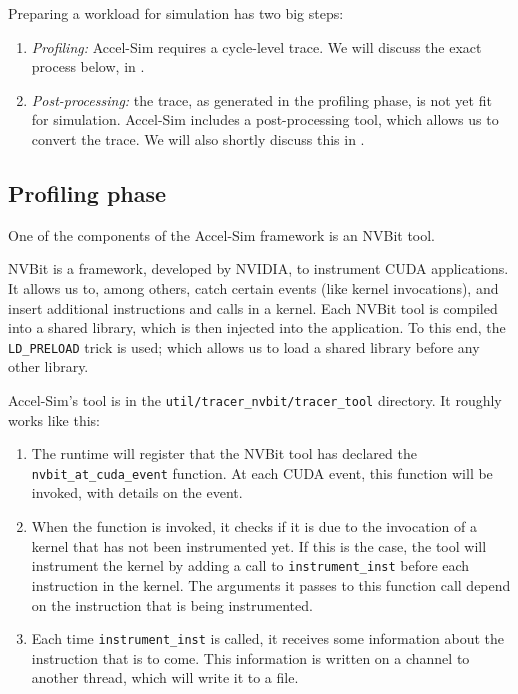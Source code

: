 Preparing a workload for simulation has two big steps:
\begin{enumerate}
    \item \textit{Profiling:} Accel-Sim requires a cycle-level trace.
    We will discuss the exact process below, in .
    \item \textit{Post-processing:} the trace, as generated in the profiling phase, is not yet fit for simulation.
    Accel-Sim includes a post-processing tool, which allows us to convert the trace.
    We will also shortly discuss this in .
\end{enumerate}

\subsection{Profiling phase}\label{subsec:profiling-phase}
One of the components of the Accel-Sim framework is an NVBit\cite{nvbit} tool.

NVBit is a framework, developed by NVIDIA, to instrument CUDA applications.
It allows us to, among others, catch certain events (like kernel invocations), and insert additional instructions and calls in a kernel.
Each NVBit tool is compiled into a shared library, which is then injected into the application.
To this end, the \verb|LD_PRELOAD| trick is used; which allows us to load a shared library before any other library.

Accel-Sim's tool is in the \verb|util/tracer_nvbit/tracer_tool| directory.
It roughly works like this:
\begin{enumerate}
    \item The runtime will register that the NVBit tool has declared the \verb|nvbit_at_cuda_event| function.
    At each CUDA event, this function will be invoked, with details on the event.
    \item When the function is invoked, it checks if it is due to the invocation of a kernel that has not been instrumented yet.
    If this is the case, the tool will instrument the kernel by adding a call to \verb|instrument_inst| before each instruction in the kernel.
    The arguments it passes to this function call depend on the instruction that is being instrumented.
    \item Each time \verb|instrument_inst| is called, it receives some information about the instruction that is to come.
    This information is written on a channel to another thread, which will write it to a file.
\end{enumerate}

